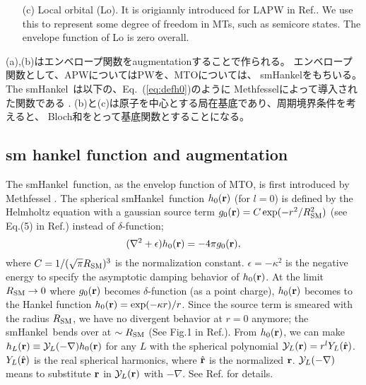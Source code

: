 \documentclass[a4paper,10pt,aip,onecolumn,amsmath,amssymb,floatfix,rmp]{revtex4-1}
\newcommand{\bfr}{{\bf r}}
\newcommand{\YY}{{\cal Y}}
\newcommand{\req}[1]{\mbox{Eq.~\!(\ref{#1})}}
\def\smh{smHankel}
\def\RSM{R_{\rm SM}}
\begin{document}
\begin{widetext}
\begin{itemize}
\item[(c)] Local orbital (Lo). It is origiannly introduced for LAPW in Ref..
   We use this to represent some degree of freedom in MTs,
   such as semicore states. The envelope function of Lo is zero overall.

\end{itemize}

(a),(b)はエンベロープ関数をaugmentationすることで作られる。
エンベロープ関数として、APWについてはPWを、MTOについては、
\smh をもちいる。The \smh \ は以下の、\req{eq:defh0}のように
Methfesselによって導入された関数である \cite{lmfchap,Bott98}.
(b)と(c)は原子を中心とする局在基底であり、周期境界条件を考えると、
Bloch和をとって基底関数とすることになる。

\subsection{sm hankel function and augmentation}
\label{sec:smh}
The \smh\ function, as the envelop function of MTO, is first introduced
by Methfessel \cite{lmfchap,Bott98}. The spherical \smh\ function
$h_0(\bfr)$ (for $l=0$) is defined by the Helmholtz equation with a
gaussian source term $g_0(\bfr) = C \exp(-r^2/\RSM^2)$ (see Eq.(5) in
Ref.\cite{lmfchap}) instead of $\delta$-function;
\begin{equation}
(\nabla^2+\epsilon)h_0(\bfr) = -4 \pi g_0(\bfr),
\label{eq:defh0}
\end{equation}
where $C=1/(\sqrt{\pi} \RSM)^3$ is the normalization constant.
$\epsilon=-\kappa^2$ is the negative energy to specify the asymptotic
damping behavior of $h_0(\bfr)$.  At the limit $\RSM \to 0$ where
$g_0(\bfr)$ becomes $\delta$-function (as a point charge), $h_0(\bfr)$
becomes to the Hankel function $h_0(\bfr)=\exp(-\kappa r)/r$.  Since the
source term is smeared with the radius $\RSM$, we have no divergent
behavior at $r=0$ anymore; the \smh\ bends over at $\sim\RSM$ (See Fig.1
in Ref.\cite{lmfchap}).  From $h_0(\bfr)$, we can make
$h_L(\bfr)\equiv\YY_L(-\nabla) h_0(\bfr)$ for any $L$ with the spherical
polynomial $\YY_L(\bfr)=r^l Y_L(\hat{\bfr})$.  $Y_L(\hat{\bfr})$ is the
real spherical harmonics, where $\hat{\bfr}$ is the normalized
$\bfr$. $\YY_L(-\nabla)$ means to substitute $\bfr$ in $\YY_L(\bfr)$
with $-\nabla$. See Ref.\cite{Bott98} for details.


\end{widetext}
\end{document}

